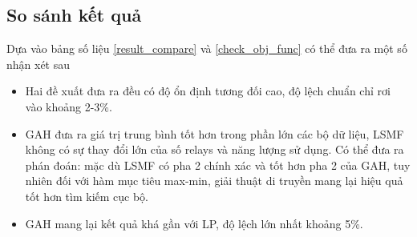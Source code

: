 \subsection{So sánh kết quả}
Dựa vào bảng số liệu \ref{result_compare} và \ref{check_obj_func} có thể đưa ra một số nhận xét sau 
\begin{itemize}
    \item Hai đề xuất đưa ra đều có độ ổn định tương đối cao, độ lệch chuẩn chỉ rơi vào khoảng 2-3\%.
    \item GAH đưa ra giá trị trung bình tốt hơn trong phần lớn các bộ dữ liệu, LSMF không có sự thay đổi lớn của số relays và năng lượng sử dụng. Có thể đưa ra phán đoán: mặc dù LSMF có pha 2 chính xác và tốt hơn pha 2 của GAH, tuy nhiên đối với hàm mục tiêu max-min, giải thuật di truyền mang lại hiệu quả tốt hơn tìm kiếm cục bộ.
    \item GAH mang lại kết quả khá gần với LP, độ lệch lớn nhất khoảng 5\%.
\end{itemize}



